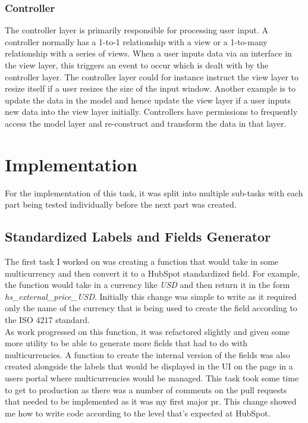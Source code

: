 \subsubsection{Controller}
The controller layer is primarily responsible for processing user input.  A controller normally has a 1-to-1 relationship with a view or a 1-to-many relationship with a series of views.  When a user inputs data via an interface in the view layer,  this triggers an event to occur which is dealt with by the controller layer. The controller layer could for instance instruct the view layer to resize itself if a user resizes the size of the input window.  Another example is to update the data in the model and hence update the view layer if a user inputs new data into the view layer initially.  Controllers have permissions to frequently access the model layer and re-construct and transform the data in that layer.

\section{Implementation}
For the implementation of this task, it was split into multiple sub-tasks with each part being tested individually before the next part was created.
\subsection{Standardized Labels and Fields Generator}

The first task I worked on was creating a function that would take in some multicurrency and then convert it to a HubSpot standardized field. \newline For example,  the function would take in a currency like \textit{USD} and then return it in the form \textit{hs\_external\_price\_USD}.  \newline Initially this change was simple to write as it required only the name of the currency that is being used to create the field according to the ISO 4217 standard.  \newline \\ As work progressed on this function,  it was refactored slightly and given some more utility to be able to generate more fields that had to do with multicurrencies.  A function to create the internal version of the fields was also created alongside the labels that would be displayed in the UI on the page in a users portal where multicurrencies would be managed.  \newline This task took some time to get to production as there was a number of comments on the pull requests that needed to be implemented as it was my first major pr.  This change showed me how to write code according to the level that's expected at HubSpot.

